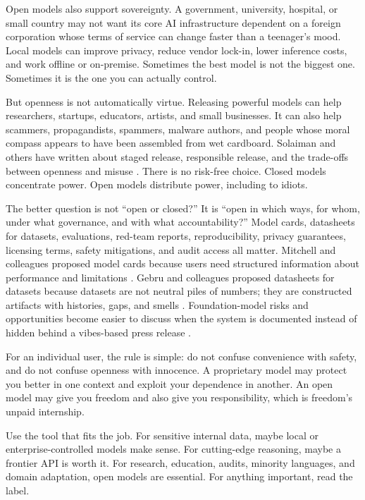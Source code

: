 \documentclass[12pt,oneside]{book}
\begin{document}
Open models also support sovereignty. A government, university, hospital, or small country may not want its core AI infrastructure dependent on a foreign corporation whose terms of service can change faster than a teenager's mood. Local models can improve privacy, reduce vendor lock-in, lower inference costs, and work offline or on-premise. Sometimes the best model is not the biggest one. Sometimes it is the one you can actually control.

But openness is not automatically virtue. Releasing powerful models can help researchers, startups, educators, artists, and small businesses. It can also help scammers, propagandists, spammers, malware authors, and people whose moral compass appears to have been assembled from wet cardboard. Solaiman and others have written about staged release, responsible release, and the trade-offs between openness and misuse \parencite{solaiman2019}. There is no risk-free choice. Closed models concentrate power. Open models distribute power, including to idiots.

The better question is not ``open or closed?'' It is ``open in which ways, for whom, under what governance, and with what accountability?'' Model cards, datasheets for datasets, evaluations, red-team reports, reproducibility, privacy guarantees, licensing terms, safety mitigations, and audit access all matter. Mitchell and colleagues proposed model cards because users need structured information about performance and limitations \parencite{mitchell2019}. Gebru and colleagues proposed datasheets for datasets because datasets are not neutral piles of numbers; they are constructed artifacts with histories, gaps, and smells \parencite{gebru2021}. Foundation-model risks and opportunities become easier to discuss when the system is documented instead of hidden behind a vibes-based press release \parencite{bommasani2021}.

For an individual user, the rule is simple: do not confuse convenience with safety, and do not confuse openness with innocence. A proprietary model may protect you better in one context and exploit your dependence in another. An open model may give you freedom and also give you responsibility, which is freedom's unpaid internship.

Use the tool that fits the job. For sensitive internal data, maybe local or enterprise-controlled models make sense. For cutting-edge reasoning, maybe a frontier API is worth it. For research, education, audits, minority languages, and domain adaptation, open models are essential. For anything important, read the label.
\end{document}
